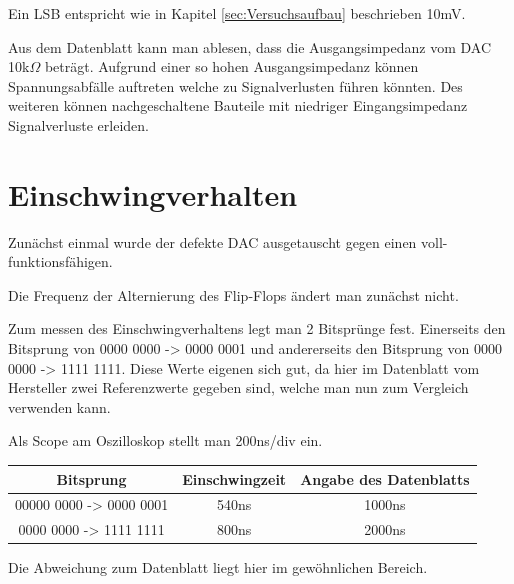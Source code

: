 Ein LSB entspricht wie in Kapitel \ref{sec:Versuchsaufbau} beschrieben 10mV.

Aus dem Datenblatt kann man ablesen, dass die Ausgangsimpedanz vom
DAC 10k$\Omega$ beträgt. Aufgrund einer so hohen Ausgangsimpedanz 
können Spannungsabfälle auftreten welche zu Signalverlusten führen 
könnten. Des weiteren können nachgeschaltene Bauteile mit niedriger
Eingangsimpedanz Signalverluste erleiden.




\section{Einschwingverhalten}

Zunächst einmal wurde der defekte DAC ausgetauscht 
gegen einen voll-funktionsfähigen. \newline

Die Frequenz der Alternierung des Flip-Flops ändert man zunächst nicht. \newline

Zum messen des Einschwingverhaltens legt man 2 Bitsprünge fest.
Einerseits den Bitsprung von 0000 0000 -> 0000 0001 und andererseits 
den Bitsprung von 0000 0000 -> 1111 1111.
Diese Werte eigenen sich gut, da hier im Datenblatt vom Hersteller 
zwei Referenzwerte gegeben sind, welche man nun zum Vergleich verwenden kann.\newline

Als Scope am Oszilloskop stellt man 200ns/div ein. \newline


\begin{tabular}[h]{c|c|c}
    Bitsprung & Einschwingzeit & Angabe des Datenblatts \\
    \hline
    00000 0000 -> 0000 0001 & 540ns & 1000ns\\
    \hline
    0000 0000 -> 1111 1111 & 800ns & 2000ns\\
\end{tabular}

Die Abweichung zum Datenblatt liegt hier im gewöhnlichen Bereich. 


